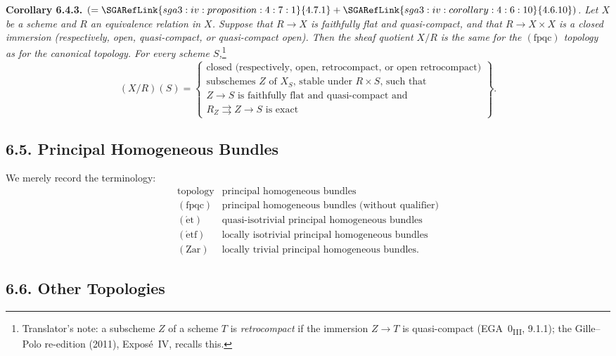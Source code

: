 \medskip
\noindent{}\textbf{Corollary 6.4.3.}
\textit{\((=\SGARefLink{sga3:iv:proposition:4:7:1}{4.7.1}+\SGARefLink{sga3:iv:corollary:4:6:10}{4.6.10})\). Let \(X\) be a scheme and \(R\) an
equivalence relation in \(X\). Suppose that \(R\to X\) is faithfully flat
and quasi-compact, and that \(R\to X\times X\) is a closed immersion
(respectively, open, quasi-compact, or quasi-compact open). Then the sheaf
quotient \(X/R\) is the same for the \((\mathrm{fpqc})\) topology as for
the canonical topology. For every scheme \(S\),}\footnote{Translator's note: a subscheme \(Z\) of a scheme \(T\) is
\emph{retrocompact} if the immersion \(Z\to T\) is quasi-compact
(EGA~0\textsubscript{III}, 9.1.1); the Gille--Polo re-edition (2011),
Expos\'e~IV, recalls this.}
\[
(X/R)(S)=
\left\{
\begin{array}{l}
\text{closed (respectively, open, retrocompact, or open retrocompact)}
\\
\text{subschemes \(Z\) of \(X_S\), stable under \(R\times S\), such that}
\\
\text{\(Z\to S\) is faithfully flat and quasi-compact and}
\\
\text{\(R_Z\rightrightarrows Z\to S\) is exact}
\end{array}
\right\}.
\tag{6.4.3.1}\label{sga3:iv:corollary:6:4:3:eq:6:4:3:1:01}
\]

\subsection*{6.5. Principal Homogeneous Bundles}

We merely record the terminology:
\[
\begin{array}{c|l}
 \text{topology}&\text{principal homogeneous bundles}\\ \hline
 (\mathrm{fpqc})&\text{principal homogeneous bundles (without qualifier)}
 \\
 (\mathrm{\acute et})&\text{quasi-isotrivial principal homogeneous bundles}
 \\
 (\mathrm{\acute etf})&\text{locally isotrivial principal homogeneous bundles}
 \\
 (\mathrm{Zar})&\text{locally trivial principal homogeneous bundles}.
\end{array}
\tag{6.5.1}\label{sga3:iv:subsection:6:5:eq:6:5:1:01}
\]

\subsection*{6.6. Other Topologies}

